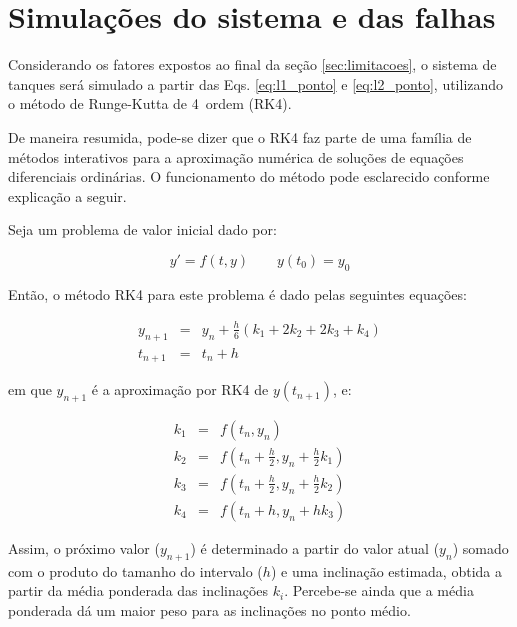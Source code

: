 \section{Simulações do sistema e das falhas}
Considerando os fatores expostos ao final da seção \ref{sec:limitacoes}, o
sistema de tanques será simulado a partir das Eqs. \ref{eq:l1_ponto} e
\ref{eq:l2_ponto}, utilizando o método de Runge-Kutta de 4\textordfeminine\
ordem (RK4).


De maneira resumida, pode-se dizer que o RK4 faz parte de uma família de métodos
interativos para a aproximação numérica de soluções de equações diferenciais
ordinárias. O funcionamento do método pode esclarecido conforme explicação a
seguir. 

Seja um problema de valor inicial dado por:

\begin{equation}\label{eq:}
y' = f(t,y) \qquad y(t_0) = y_0
\end{equation}

Então, o método RK4 para este problema é dado pelas seguintes equações:

\begin{eqnarray}
y_{n+1} & = & y_n + \frac{h}{6}\left(k_1 + 2k_2 + 2k_3 + k_4\right)\\
t_{n+1} & = & t_n + h
\end{eqnarray}

\noindent em que $y_{n+1}$ é a aproximação por RK4 de $y(t_{n + 1})$, e:

\begin{eqnarray}
k_1 & = & f\left(t_n,y_n\right)\\
k_2 & = & f\left(t_n+\frac{h}{2},y_n+\frac{h}{2}k_1\right)\\
k_3 & = & f\left(t_n+\frac{h}{2},y_n+\frac{h}{2}k_2\right)\\
k_4 & = & f\left(t_n+h,y_n+hk_3\right)
\end{eqnarray}

Assim, o próximo valor ($y_{n+1}$) é determinado a partir do valor atual ($y_n$)
somado com o produto do tamanho do intervalo ($h$) e uma inclinação estimada,
obtida a partir da média ponderada das inclinações $k_i$. Percebe-se ainda que a
média ponderada dá um maior peso para as inclinações no ponto médio.

